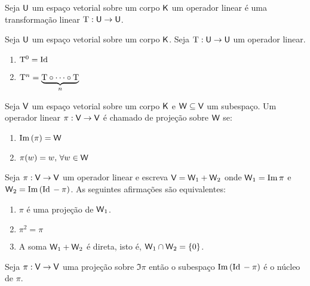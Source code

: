 \documentclass[10pt,a4paper]{book}
\begin{document}
\begin{definition}
	Seja $\mathsf{ U }$ um espaço vetorial sobre um corpo $\mathsf{ K }$ um operador linear é uma transformação linear $\mathrm{ T } : \mathsf{ U } \rightarrow \mathsf{ U }$.
\end{definition}

\begin{definition}[Potência]
	Seja $\mathsf{ U }$ um espaço vetorial sobre um corpo $\mathsf{ K }$. Seja $\mathrm{ T } : \mathsf{ U } \rightarrow \mathsf{ U }$ um operador linear.
	\begin{enumerate}
		\item $\mathrm{ T }^0 = \mathrm{ Id }\,$
		\item $\mathrm{ T }^n = \underbrace{\mathrm{ T } \circ \dots \circ \mathrm{ T }}_{n}$
	\end{enumerate}
\end{definition}

\begin{definition}[Projeção]
	Seja $\mathsf{ V }$ um espaço vetorial sobre um corpo $\mathsf{ K }$ e $\mathsf{ W } \subseteq \mathsf{ V }$ um subespaço. Um operador linear $\pi : \mathsf{ V } \rightarrow \mathsf{ V }$ é chamado de projeção sobre $\mathsf{ W }$ se:
	\begin{enumerate}
		\item $\mathrm{ Im }\, (\pi) = \mathsf{ W }$
		\item $\pi(w) = w, \, \forall w \in \mathsf{ W }$
	\end{enumerate}
\end{definition}

\begin{proposition}
	Seja $\pi : \mathsf{ V } \rightarrow \mathsf{ V }$ um operador linear e escreva $\mathsf{ V } = \mathsf{ W }_1 + \mathsf{ W }_2$ onde $\mathsf{ W }_1 = \mathrm{ Im }\, \pi$ e $\mathsf{ W }_2 = \mathrm{ Im }\, (\mathrm{ Id }\, - \pi)$. As seguintes afirmações são equivalentes:
	\begin{enumerate}
		\item $\pi$ é uma projeção de $\mathsf{ W }_1$.
		\item $\pi^2 = \pi$
		\item A soma $\mathsf{ W }_1 + \mathsf{ W }_2$ é direta, isto é, $\mathsf{ W }_1 \cap \mathsf{ W }_2 = \{ 0 \}$.
	\end{enumerate}
\end{proposition}

\begin{corollary}
	Seja $\pi : \mathsf{ V } \rightarrow \mathsf{ V }$ uma projeção sobre $\Im \pi$ então o subespaço $\mathrm{ Im }\, (\mathrm{ Id }\, - \pi)$ é o núcleo de $\pi$.
\end{corollary}
\end{document}
